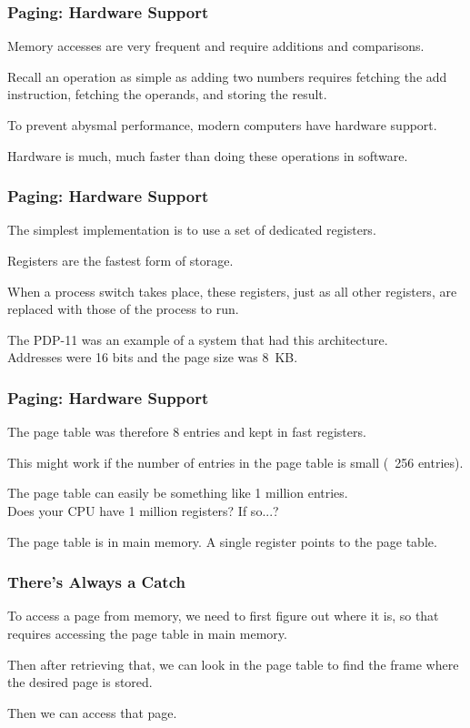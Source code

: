 \begin{frame}
\frametitle{Paging: Hardware Support}

Memory accesses are very frequent and require additions and comparisons. 

Recall an operation as simple as adding two numbers requires fetching the add instruction, fetching the operands, and storing the result. 

To prevent abysmal performance, modern computers have hardware support.

Hardware is much, much faster than doing these operations in software.



\end{frame}

\begin{frame}
\frametitle{Paging: Hardware Support}

The simplest implementation is to use a set of dedicated registers.

Registers are the fastest form of storage. 

When a process switch takes place, these registers, just as all other registers, are replaced with those of the process to run. 

The PDP-11 was an example of a system that had this architecture.\\
\quad Addresses were 16 bits and the page size was 8~KB.

\end{frame}

\begin{frame}
\frametitle{Paging: Hardware Support}

The page table was therefore 8 entries and kept in fast registers. 

This might work if the number of entries in the page table is small (~256 entries). 

The page table can easily be something like 1 million entries.\\
\quad Does your CPU have 1 million registers? If so...?

The page table is in main memory. A single register points to the page table.


\end{frame}

\begin{frame}
\frametitle{There's Always a Catch}

To access a page from memory, we need to first figure out where it is, so that requires accessing the page table in main memory. 

Then after retrieving that, we can look in the page table to find the frame where the desired page is stored. 

Then we can access that page. 

\end{frame}

